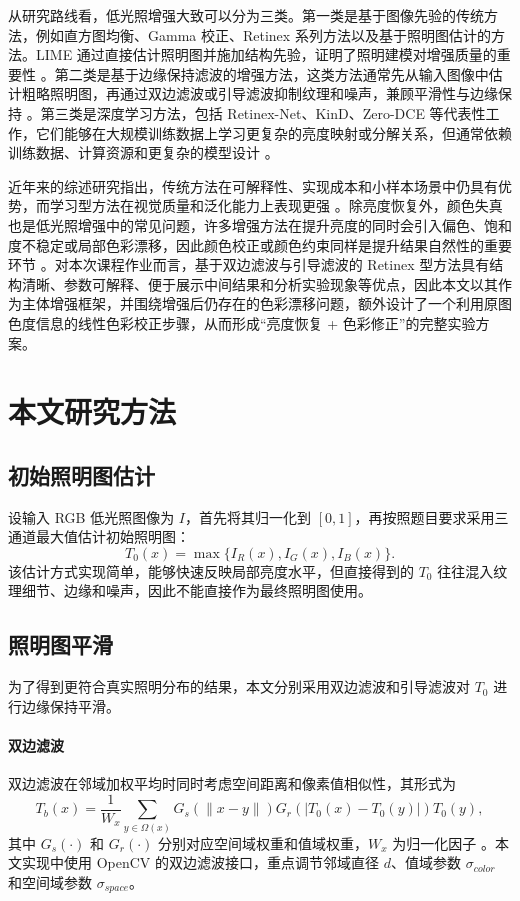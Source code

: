 \documentclass[10pt,twocolumn,letterpaper]{article}
\begin{document}
从研究路线看，低光照增强大致可以分为三类。第一类是基于图像先验的传统方法，例如直方图均衡、Gamma 校正、Retinex 系列方法以及基于照明图估计的方法。LIME 通过直接估计照明图并施加结构先验，证明了照明建模对增强质量的重要性 \cite{guo2016lime}。第二类是基于边缘保持滤波的增强方法，这类方法通常先从输入图像中估计粗略照明图，再通过双边滤波或引导滤波抑制纹理和噪声，兼顾平滑性与边缘保持 \cite{tomasi1998bilateral,he2010guided,he2013guided}。第三类是深度学习方法，包括 Retinex-Net、KinD、Zero-DCE 等代表性工作，它们能够在大规模训练数据上学习更复杂的亮度映射或分解关系，但通常依赖训练数据、计算资源和更复杂的模型设计 \cite{wei2018retinexnet,zhang2019kind,guo2020zerodce}。

近年来的综述研究指出，传统方法在可解释性、实现成本和小样本场景中仍具有优势，而学习型方法在视觉质量和泛化能力上表现更强 \cite{guo2023survey}。除亮度恢复外，颜色失真也是低光照增强中的常见问题，许多增强方法在提升亮度的同时会引入偏色、饱和度不稳定或局部色彩漂移，因此颜色校正或颜色约束同样是提升结果自然性的重要环节 \cite{zhang2022dccnet}。对本次课程作业而言，基于双边滤波与引导滤波的 Retinex 型方法具有结构清晰、参数可解释、便于展示中间结果和分析实验现象等优点，因此本文以其作为主体增强框架，并围绕增强后仍存在的色彩漂移问题，额外设计了一个利用原图色度信息的线性色彩校正步骤，从而形成“亮度恢复 + 色彩修正”的完整实验方案。

\section{本文研究方法}
\subsection{初始照明图估计}
设输入 RGB 低光照图像为 $I$，首先将其归一化到 $[0,1]$，再按照题目要求采用三通道最大值估计初始照明图：
\begin{equation}
T_0(x)=\max\{I_R(x),I_G(x),I_B(x)\}.
\end{equation}
该估计方式实现简单，能够快速反映局部亮度水平，但直接得到的 $T_0$ 往往混入纹理细节、边缘和噪声，因此不能直接作为最终照明图使用。

\subsection{照明图平滑}
为了得到更符合真实照明分布的结果，本文分别采用双边滤波和引导滤波对 $T_0$ 进行边缘保持平滑。

\paragraph{双边滤波}
双边滤波在邻域加权平均时同时考虑空间距离和像素值相似性，其形式为
\begin{equation}
T_b(x)=\frac{1}{W_x}\sum_{y\in\Omega(x)}G_s(\|x-y\|)G_r(|T_0(x)-T_0(y)|)T_0(y),
\end{equation}
其中 $G_s(\cdot)$ 和 $G_r(\cdot)$ 分别对应空间域权重和值域权重，$W_x$ 为归一化因子 \cite{tomasi1998bilateral}。本文实现中使用 OpenCV 的双边滤波接口，重点调节邻域直径 $d$、值域参数 $\sigma_{color}$ 和空间域参数 $\sigma_{space}$。
\end{document}
